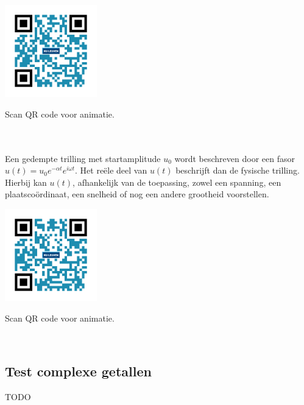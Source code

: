 \begin{minipage}{.25\linewidth}
	\raggedright
	\includegraphics[width=4cm]{3_gonio_complexe_getallen/inputs/QR_Code_ANIMATIE6_module3}
\end{minipage}
\begin{minipage}{.7\linewidth}
	Scan QR code voor animatie.
\end{minipage}    \\     \\

Een gedempte trilling met startamplitude $u_{0}$ wordt beschreven door een fasor $u(t)=u_{0}e^{-\alpha t}e^{i\omega t}$. Het re\"{e}le deel van $u(t)$ beschrijft dan de fysische trilling. Hierbij kan $u(t)$, afhankelijk van de toepassing, zowel een spanning, een plaatsco\"{o}rdinaat, een snelheid of nog een andere grootheid voorstellen.\\

\begin{minipage}{.25\linewidth}
	\raggedright
	\includegraphics[width=4cm]{3_gonio_complexe_getallen/inputs/QR_Code_ANIMATIE7_module3}
\end{minipage}
\begin{minipage}{.7\linewidth}
	Scan QR code voor animatie.
\end{minipage}   \\

\subsection{Test complexe getallen}
TODO